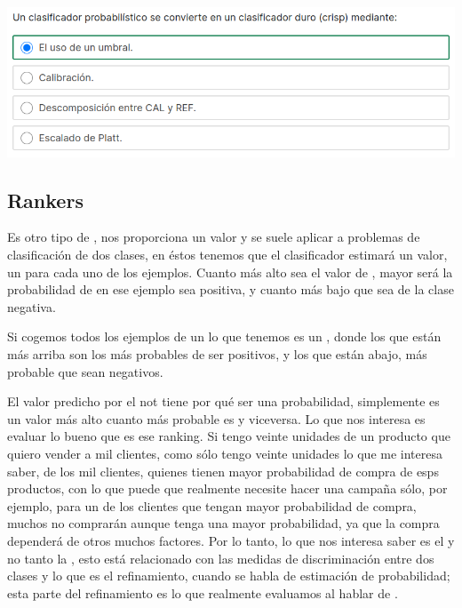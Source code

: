 \begin{center}
    \includegraphics[scale=.75]{images/mod02-18.png}
\end{center}

\subsection{Rankers}

Es otro tipo de , nos proporciona un valor y se suele aplicar a problemas de clasificación de dos clases, en éstos tenemos que el clasificador estimará un valor, un  para cada uno de los ejemplos. Cuanto más alto sea el valor de , mayor será la probabilidad de en ese ejemplo sea positiva, y cuanto más bajo que sea de la clase negativa.

Si cogemos todos los ejemplos de un  lo que tenemos es un , donde los que están más arriba son los más probables de ser positivos, y los que están abajo, más probable que sean negativos.

El valor predicho por el  not tiene por qué ser una probabilidad, simplemente es un valor más alto cuanto más probable es y viceversa. Lo que nos interesa es evaluar lo bueno que es ese ranking. Si tengo veinte unidades de un producto que quiero vender a mil clientes, como sólo tengo veinte unidades lo que me interesa saber, de los mil clientes, quienes tienen mayor probabilidad de compra de esps productos, con lo que puede que realmente necesite hacer una campaña sólo, por ejemplo, para un  de los clientes que tengan mayor probabilidad de compra, muchos no comprarán aunque tenga una mayor probabilidad, ya que la compra dependerá de otros muchos factores. Por lo tanto, lo que nos interesa saber es el  y no tanto la , esto está relacionado con las medidas de discriminación entre dos clases y lo que es el refinamiento, cuando se habla de estimación de probabilidad; esta parte del refinamiento es lo que realmente evaluamos al hablar de .

